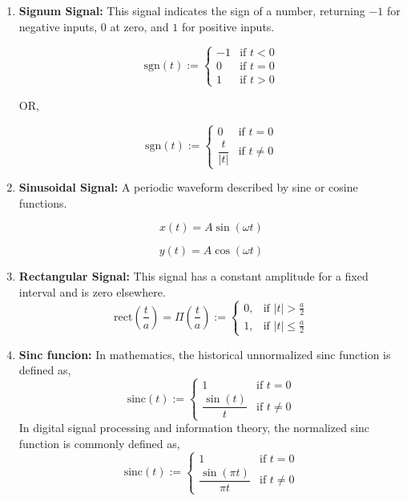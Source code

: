 \begin{enumerate}
\item \textbf{Signum Signal:} This signal indicates the sign of a number, returning $-1$ for negative inputs, $0$ at zero, and $1$ for positive inputs.
    \begin{center}
    \begin{minipage}{0.45\linewidth}
    \[
        \text{sgn}(t) := \begin{cases}
            -1 & \text{if } t < 0 \\
            0 & \text{if } t = 0 \\
            1 & \text{if } t > 0
        \end{cases}
    \]
    \end{minipage}
    OR,
    \hfill
    \begin{minipage}{0.45\linewidth}
        \[
            \text{sgn}(t) := \begin{cases}
            0 & \text{if } t = 0 \\
            \dfrac{t}{|t|} & \text{if } t \neq 0
        \end{cases}
        \]
    \end{minipage}
    \end{center}
\item \textbf{Sinusoidal Signal:} A periodic waveform described by sine or cosine functions. 
    \begin{center}
        \begin{minipage}{0.45\linewidth}
            \[x(t) = A \sin(\omega t)\]
        \end{minipage}
        \begin{minipage}{0.45\linewidth}
            \[y(t) = A \cos(\omega t)\]
        \end{minipage}
    \end{center}

\item \textbf{Rectangular Signal:} This signal has a constant amplitude for a fixed interval and is zero elsewhere.
    \[\text{rect}\left(\dfrac{t}{a}\right) = \Pi\left(\dfrac{t}{a}\right) := \begin{cases}
        0,&\text{if } \left\lvert t \right\rvert > \frac{a}{2}\\
        1,&\text{if } \left\lvert t \right\rvert \leq \frac{a}{2}
    \end{cases}\]

\item \textbf{Sinc funcion:} 
    In mathematics, the historical unnormalized sinc function is defined as,
        \[\text{sinc}(t) := \begin{cases}
            1&\text{if } t = 0\\
            \dfrac{\sin(t)}{t}&\text{if } t \neq 0
        \end{cases}\]
        In digital signal processing and information theory, the normalized sinc function is commonly defined as,
        \[\text{sinc}(t) := \begin{cases}
            1&\text{if } t = 0\\
            \dfrac{\sin(\pi t)}{\pi t}&\text{if } t \neq 0
        \end{cases}\]

\end{enumerate}